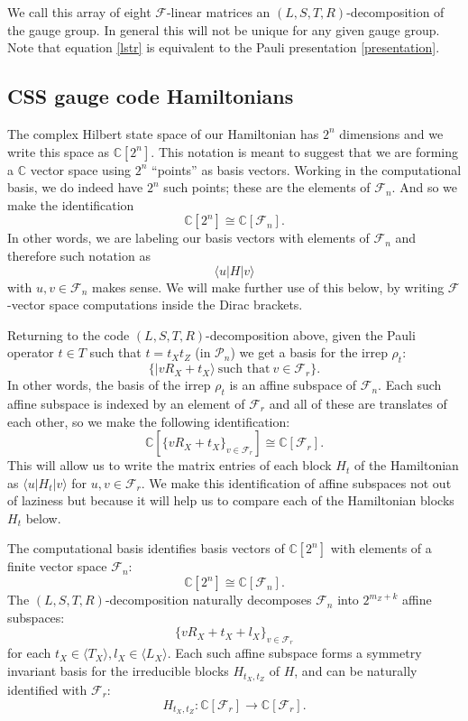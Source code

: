 \documentclass[a4paper,onecolumn,11pt,unpublished]{quantumarticle}
\newcommand{\Eref}[1]{\eqref{#1}}
\def\Complex{\mathbb{C}}
\def\Pauli{\mathcal{P}}
\newcommand{\ket}[1]{|{#1}\rangle}
\newcommand{\bra}[1]{\langle{#1}|}
\def\Span#1{\langle #1 \rangle}
\newcommand{\Field}{\mathcal{F}}
\def\Fnd{\Field_{n}}
\def\Frd{\Field_{r}}
\renewenvironment{framed}
{\begin{samepage}
\MakeFramed{\hsize0.8\linewidth\advance\hsize-\width\FrameRestore}}
{\endMakeFramed\end{samepage}}
\begin{document}
We call this array of eight $\Field$-linear 
matrices
an $(L,S,T,R)$-decomposition of the gauge group.
In general this will not be unique for
any given gauge group.
Note that equation \Eref{lstr} is equivalent to the 
Pauli presentation \Eref{presentation}.

\subsection{CSS gauge code Hamiltonians}\label{Sec37}

The complex Hilbert state space of our
Hamiltonian has $2^n$ dimensions and we
write this space as $\Complex[2^n]$.
This notation is meant to suggest that
we are forming a $\Complex$ vector space
using $2^n$ ``points'' 
as basis vectors.
Working in the computational basis,
we do indeed have $2^n$ such points; 
these are the elements of $\Fnd.$
And so we make the identification
$$
    \Complex[2^n] \cong \Complex[\Fnd].
$$
In other words, we are labeling 
our basis vectors with elements of $\Fnd$
and therefore such notation as
$$
    \bra{u} H \ket{v}
$$
with $u, v \in \Fnd$ makes sense.
We will make further use of this below,
by writing  $\Field$-vector space 
computations inside the Dirac brackets.

Returning to the code $(L,S,T,R)$-decomposition
above,
given the Pauli operator $t\in T$ such that $t = t_X t_Z$ (in $\Pauli_n$)
we get a basis for the irrep $\rho_t$:
$$
    \{ \ket{v R_X + t_X} \ \mbox{such that}\  v \in \Frd \}.
$$
In other words,
the basis of the irrep $\rho_t$ is 
an affine subspace of $\Fnd.$
Each such affine subspace is indexed by an
element of $\Frd$ and
all of these are
translates of each other,
so we make the following identification:
$$
\Complex[\{vR_X+t_X\}_{v\in\Frd}]
\cong \Complex[\Frd].
$$
This will allow us to write the matrix entries
of each block $H_t$ of the Hamiltonian
as $\bra{u}H_t\ket{v}$ for $u,v\in\Frd.$
We make this identification of affine subspaces
not out of laziness but because it will
help us to compare each of
the Hamiltonian blocks $H_t$ below.

\begin{framed}
\noindent
The computational basis identifies
basis vectors of $\Complex[2^n]$
with elements of a finite vector space $\Fnd$:
$$
    \Complex[2^n] \cong \Complex[\Fnd].
$$
The $(L,S,T,R)$-decomposition naturally
decomposes $\Fnd$ into $2^{m_Z+k}$ affine subspaces:
$$
    \{ v R_X + t_X + l_X \}_{v\in\Frd}
$$
for each $t_X \in \Span{T_X}, l_X \in \Span{L_X}.$
Each such affine subspace forms a
symmetry invariant basis
for the irreducible blocks $H_{t_X,t_Z}$ of $H$,
and can be naturally identified with $\Frd:$
$$
    H_{t_X,t_Z} : \Complex[\Frd] \to \Complex[\Frd].
$$
\end{framed}
\end{document}
